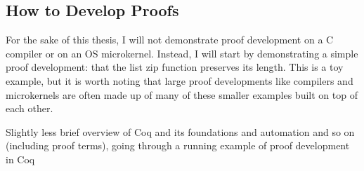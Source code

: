 \subsection{How to Develop Proofs}

For the sake of this thesis, I will not demonstrate proof development on a C compiler or on an OS microkernel.
Instead, I will start by demonstrating a simple proof development: 
that the list zip function preserves its length.
This is a toy example, but it is worth noting that large proof developments like compilers and microkernels
are often made up of many of these smaller examples built on top of each other.

Slightly less brief overview of Coq and its foundations and automation and so on (including proof terms), going through a running example of proof development in Coq

